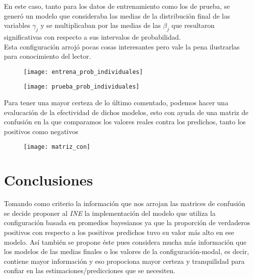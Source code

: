 \documentclass[DIV=calc, 
					paper=letter, 
					fontsize=11pt, 
					twocolumn]{scrartcl}
\begin{document}
En este caso, tanto para los datos de entrenamiento como los de prueba, se gener\'o un modelo que consideraba las medias de la distribuci\'on final de las variables $\gamma_j$ y se multiplicaban por las medias de las $\beta_j$ que resultaron significativas con respecto a sus intervalos de probabilidad.\\

Esta configuraci\'on arroj\'o pocas cosas interesantes pero vale la pena ilustrarlas para conocimiento del lector.\\

\begin{figure}[H]
\caption{}
\centering
\texttt{[image: entrena\_prob\_individuales]}
\label{fig:FL}
\end{figure}

\begin{figure}[H]
\caption{}
\centering
\texttt{[image: prueba\_prob\_individuales]}
\label{fig:CL}
\end{figure}


Para tener una mayor certeza de lo \'ultimo comentado, podemos hacer una evalucaci\'on de la efectividad de dichos modelos, esto con ayuda de una matriz de confusi\'on en la que comparamos los valores reales contra los predichos, tanto los positivos como negativos

\begin{figure}[H]
\caption{}
\centering
\texttt{[image: matriz\_con]}
\label{fig:mc}
\end{figure}


\section{Conclusiones}
\vspace{3mm}

Tomando como criterio la informaci\'on que nos arrojan las matrices de confusi\'on se decide proponer al \textit{INE} la implementaci\'on del modelo que utiliza la configuraci\'on basada en promedios bayesianos ya que la proporci\'on de verdaderos positivos con respecto a los positivos predichos tuvo su valor m\'as alto en ese modelo. As\'i tambi\'en se propone \'este pues considera mucha m\'as informaci\'on que los modelos de las medias finales o los valores de la configuraci\'on-modal, es decir, contiene mayor informaci\'on y eso propociona mayor certeza y tranquilidad para confiar en las estimaciones/predicciones que se necesiten.\\
\end{document}
